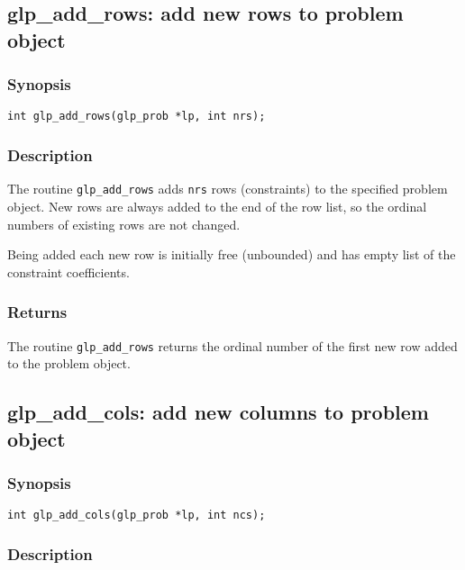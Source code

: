 \subsection{glp\_add\_rows: add new rows to problem object}

\subsubsection*{Synopsis}

\begin{verbatim}
int glp_add_rows(glp_prob *lp, int nrs);
\end{verbatim}

\subsubsection*{Description}

The routine \verb|glp_add_rows| adds \verb|nrs| rows (constraints) to
the specified problem object. New rows are always added to the end of
the row list, so the ordinal numbers of existing rows are not changed.

Being added each new row is initially free (unbounded) and has empty
list of the constraint coefficients.

\subsubsection*{Returns}

The routine \verb|glp_add_rows| returns the ordinal number of the first
new row added to the problem object.

\newpage

\subsection{glp\_add\_cols: add new columns to problem object}

\subsubsection*{Synopsis}

\begin{verbatim}
int glp_add_cols(glp_prob *lp, int ncs);
\end{verbatim}

\subsubsection*{Description}

